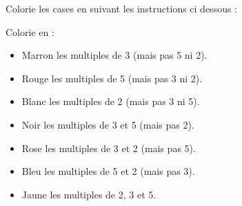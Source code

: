  Colorie les cases en suivant les instructions ci dessous :

\begin{minipage}{0.45\textwidth}
    
\end{minipage}
\hfil
\begin{minipage}{0.45\textwidth}
    Colorie en :
    \begin{itemize}[leftmargin=0.7cm]
        \item Marron les multiples de 3 (mais pas 5 ni 2).
        \item Rouge les multiples de 5 (mais pas 3 ni 2).
        \item Blanc les multiples de 2 (mais pas 3 ni 5).
        \item Noir les multiples de 3 et 5 (mais pas 2).
        \item Rose les multiples de 3 et 2 (mais pas 5).
        \item Bleu les multiples de 5 et 2 (mais pas 3).
        \item Jaune les multiples de 2, 3 et 5.
    \end{itemize}
\end{minipage}
